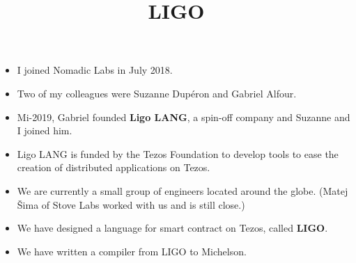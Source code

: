 \documentclass[wide]{slides}
\begin{document}
\begin{slide}
  \title{LIGO}

  \begin{itemize}

    \item I joined Nomadic Labs in July 2018.

    \item Two of my colleagues were Suzanne Dupéron and Gabriel
      Alfour.

    \item Mi-2019, Gabriel founded \textbf{Ligo LANG}, a spin-off
      company and Suzanne and I joined him.

    \item Ligo LANG is funded by the Tezos Foundation to develop tools
      to ease the creation of distributed applications on Tezos.

    \item We are currently a small group of engineers located around
      the globe. (Matej \v{S}ima of Stove Labs worked with us and is
      still close.)

    \item We have designed a language for smart contract on Tezos,
      called \textbf{LIGO}.

    \item We have written a compiler from LIGO to Michelson.

  \end{itemize}

\end{slide}
\end{document}
